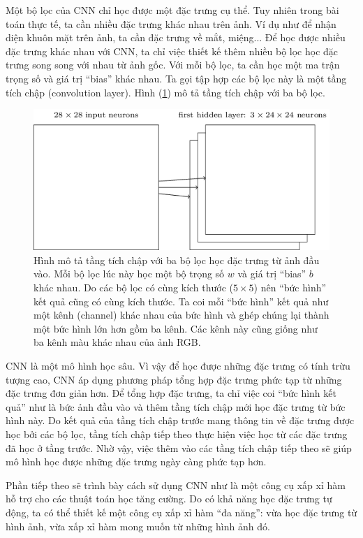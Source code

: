 	Một bộ lọc của CNN chỉ học được một đặc trưng cụ thể.
	Tuy nhiên trong bài toán thực tế, ta cần nhiều đặc trưng khác nhau trên ảnh.
	Ví dụ như để nhận diện khuôn mặt trên ảnh, ta cần đặc trưng về mắt, miệng...
	Để học được nhiều đặc trưng khác nhau với CNN, ta chỉ việc thiết kế thêm nhiều bộ lọc học đặc trưng song song với nhau từ ảnh gốc.
	Với mỗi bộ lọc, ta cần học một ma trận trọng số và giá trị ``bias'' khác nhau.
	Ta gọi tập hợp các bộ lọc này là một tầng tích chập (convolution layer).
	Hình (\ref{fig_cnn_layer}) mô tả tầng tích chập với ba bộ lọc.
	\begin{figure}
		\centering
		\includegraphics[width=\textwidth]{cnn_layer}
		\caption[Tầng tích chập với ba bộ lọc]{Hình mô tả tầng tích chập với ba bộ lọc học đặc trưng từ ảnh đầu vào.
		Mỗi bộ lọc lúc này học một bộ trọng số $w$ và giá trị ``bias'' $b$ khác nhau.
		Do các bộ lọc có cùng kích thước ($5\times5$) nên ``bức hình'' kết quả cũng có cùng kích thước.
		Ta coi mỗi ``bức hình'' kết quả như một kênh (channel) khác nhau của bức hình và ghép chúng lại thành một bức hình lớn hơn gồm ba kênh.
		Các kênh này cũng giống như ba kênh màu khác nhau của ảnh RGB.}
		\label{fig_cnn_layer}
	\end{figure}
	
	CNN là một mô hình học sâu.
	Vì vậy để học được những đặc trưng có tính trừu tượng cao, CNN áp dụng phương pháp tổng hợp đặc trưng phức tạp từ những đặc trưng đơn giản hơn.
	Để tổng hợp đặc trưng, ta chỉ việc coi ``bức hình kết quả'' như là bức ảnh đầu vào và thêm tầng tích chập mới học đặc trưng từ bức hình này.
	Do kết quả của tầng tích chập trước mang thông tin về đặc trưng được học bởi các bộ lọc, tầng tích chập tiếp theo thực hiện việc học từ các đặc trưng đã học ở tầng trước.
	Nhờ vậy, việc thêm vào các tầng tích chập tiếp theo sẽ giúp mô hình học được những đặc trưng ngày càng phức tạp hơn.
	
	Phần tiếp theo sẽ trình bày cách sử dụng CNN như là một công cụ xấp xỉ hàm hỗ trợ cho các thuật toán học tăng cường.
	Do có khả năng học đặc trưng tự động, ta có thể thiết kế một công cụ xấp xỉ hàm ``đa năng'': vừa học đặc trưng từ hình ảnh, vừa xấp xỉ hàm mong muốn từ những hình ảnh đó.


